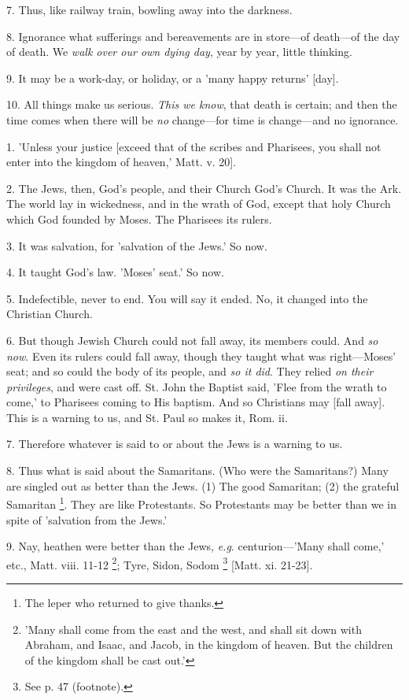 7. Thus, like railway train, bowling away into
the darkness.

8. Ignorance what sufferings and bereavements are
in store—of death—of the day of death. We \emph{walk over our own
dying day}, year by year, little thinking.

9. It may be a work-day, or holiday, or a 'many
happy returns' [day].

10. All things make us serious. \emph{This we know},
that death is certain; and then the time comes when there will be \emph{no}
change—for time is change—and no ignorance.


1. 'Unless your justice [exceed that of the
scribes and Pharisees, you shall not enter into the kingdom of
heaven,' Matt. v. 20].

2. The Jews, then, God's people, and their Church
God's Church. It was the Ark. The world lay in wickedness, and in the
wrath of God, except that holy Church which God founded by Moses. The
Pharisees its rulers.

3. It was salvation, for 'salvation of the Jews.'
So now.

4. It taught God's law. 'Moses' seat.' So now.

5. Indefectible, never to end. You will say it
ended. No, it changed into the Christian Church.

6. But though Jewish Church could not fall away,
its members could. And \emph{so now}. Even its rulers could fall
away, though they taught what was right—Moses' seat; and so could
the body of its people, and \emph{so it did}. They relied \emph{on their
privileges}, and were cast off. St. John the Baptist said, 'Flee
from the wrath to come,' to Pharisees coming to His baptism. And so
Christians may [fall away]. This is a warning to us, and St. Paul so
makes it, Rom. ii.

7. Therefore whatever is said to or about the
Jews is a warning to us.

8. Thus what is said about the Samaritans. (Who
were the Samaritans?) Many are singled out as better than the Jews.
(1) The good Samaritan; (2) the grateful Samaritan \footnote{The leper who returned
to give thanks.}. They are like Protestants. So Protestants may be better than
we in spite of 'salvation from the Jews.'

9. Nay, heathen were better than the Jews, \emph{e.g}.
centurion—'Many shall come,' etc., Matt. viii. 11-12 \footnote{'Many shall come from
the east and the west, and shall sit down with Abraham, and Isaac, and
Jacob, in the kingdom of heaven. But the children of the kingdom shall
be cast out.'}; Tyre, Sidon, Sodom \footnote{See p. 47 (footnote).}
[Matt. xi. 21-23].

